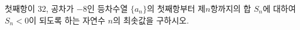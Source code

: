 첫째항이 $32$, 공차가 $-8$인 등차수열 $\{a_n\}$의 첫째항부터 제$n$항까지의 합 $S_n$에 대하여 $S_n<0$이 되도록 하는 자연수 $n$의 최솟값을 구하시오.
